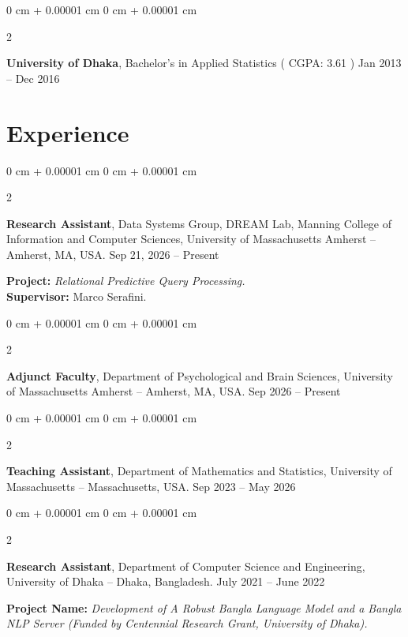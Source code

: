 \documentclass[10pt, letterpaper]{article}
\newenvironment{highlights}{
    \begin{itemize}[
        topsep=0.10 cm,
        parsep=0.10 cm,
        partopsep=0pt,
        itemsep=0pt,
        leftmargin=0 cm + 10pt
    ]
}{
    \end{itemize}
} %
\newenvironment{onecolentry}{
    \begin{adjustwidth}{
        0 cm + 0.00001 cm
    }{
        0 cm + 0.00001 cm
    }
}{
    \end{adjustwidth}
} %
\newenvironment{twocolentry}[2][]{
    \onecolentry
    \def\secondColumn{#2}
    \setcolumnwidth{\fill, 4.5 cm}
    \begin{paracol}{2}
}{
    \switchcolumn \raggedleft \secondColumn
    \end{paracol}
    \endonecolentry
} %
\begin{document}
            \vspace{0.20 cm}
    \begin{twocolentry}{
            Jan 2013 – Dec 2016
        }
            \textbf{University of Dhaka}, Bachelor's in Applied Statistics ( CGPA: 3.61 )\end{twocolentry}
        \vspace{0.10 cm}
    
    \section{Experience}

    \begin{twocolentry}{
            Sep 21, 2026 -- Present
        }
            \textbf{Research Assistant}, Data Systems Group, DREAM Lab, Manning College of Information and Computer Sciences, University of Massachusetts Amherst -- Amherst, MA, USA.\end{twocolentry}

    \textbf{Project: }\textit{Relational Predictive Query Processing.}\\
    \textbf{Supervisor: }Marco Serafini.\\

    \begin{twocolentry}{
            Sep 2026 -- Present
        }
            \textbf{Adjunct Faculty}, Department of Psychological and Brain Sciences, University of Massachusetts Amherst -- Amherst, MA, USA.\end{twocolentry}
    
    
    \begin{twocolentry}{
            Sep 2023 – May 2026
        }
            \textbf{Teaching Assistant}, Department of Mathematics and Statistics, University of Massachusetts -- Massachusetts, USA.\end{twocolentry}
   \begin{twocolentry}{
            July 2021 -- June 2022
        }
            \textbf{Research Assistant}, Department of Computer Science and Engineering, University of Dhaka -- Dhaka, Bangladesh.\end{twocolentry} 

    \textbf{Project Name:}
    \textit{Development of A Robust Bangla Language Model and a Bangla NLP Server (Funded by Centennial Research Grant, University of Dhaka).}\\
\end{document}
